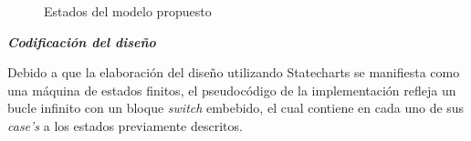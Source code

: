 \documentclass[journal]{IEEEtran}
\begin{document}
\begin{figure}[!t]
{   \label{fig:estado-tem}
}

\caption{Estados del modelo propuesto}
\label{fig:estados-modelo}
\end{figure}

\vspace{0.5cm}
\textbf{\emph{Codificación del diseño}}

Debido a que la elaboración del diseño utilizando Statecharts se manifiesta como una máquina de estados finitos, el pseudocódigo de la implementación refleja un bucle infinito con un bloque \emph{switch} embebido, el cual contiene en cada uno de sus \emph{case’s} a los estados previamente descritos.
\end{document}
